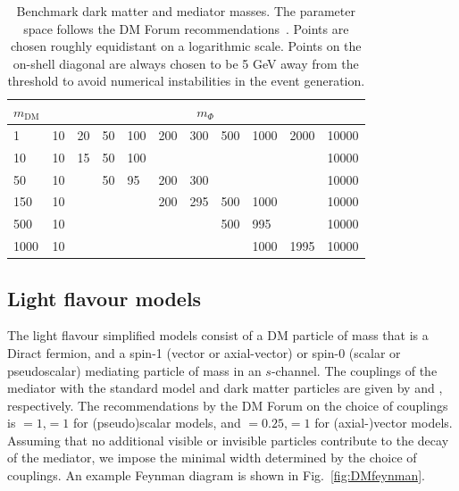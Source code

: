 \begin{table}[h!] \centering \begin{tabular}{l|llllllllll}\hline \hline
$m_\textrm{DM}$  & \multicolumn{10}{c}{$m_\Phi$}
\\ \hline 1    & 10 & 20 & 50 & 100 & 200 & 300 & 500 & 1000 & 2000 & 10000 \\
10   & 10 & 15 & 50 & 100 &     &     &     &      &      & 10000 \\ 50   & 10 &
& 50 & 95  & 200 & 300 &     &      &      & 10000 \\ 150  & 10 &    &    &
& 200 & 295 & 500 & 1000 &      & 10000 \\ 500  & 10 &    &    &     &     &
& 500 & 995  &      & 10000 \\ 1000 & 10 &    &    &     &     &     &     &
1000 & 1995 & 10000\\ \hline \hline \end{tabular} \caption{Benchmark dark
matter and mediator masses. The parameter space follows the
DM Forum recommendations~\cite{Abercrombie:2015wmb}. Points are chosen roughly
equidistant on a logarithmic scale. Points on the on-shell diagonal are always 
chosen to be 5 GeV away from the threshold to avoid numerical instabilities in 
the event generation.} \label{tab:DMgrid} \end{table}





\subsection{Light flavour models} \label{sec:dm_lightjet}

The light flavour simplified models consist of a DM particle \pchi of mass
\mchi that is a Diract fermion, and a spin-1 (vector or axial-vector) or spin-0
(scalar or pseudoscalar) mediating particle \pphi of mass \mphi in an
$s$-channel. The couplings of the mediator with the standard model and dark
matter particles are given by \gsm and \gdm, respectively. The recommendations
by the DM Forum on the choice of couplings is \gsm$=1$,\gdm$=1$ for
(pseudo)scalar models, and \gsm$=0.25$,\gdm$=1$ for (axial-)vector models.
Assuming that no additional visible or invisible particles contribute to the decay 
of the mediator, we impose the minimal width determined by the choice of couplings. 
An example Feynman diagram is shown in Fig.~\ref{fig:DMfeynman}.


